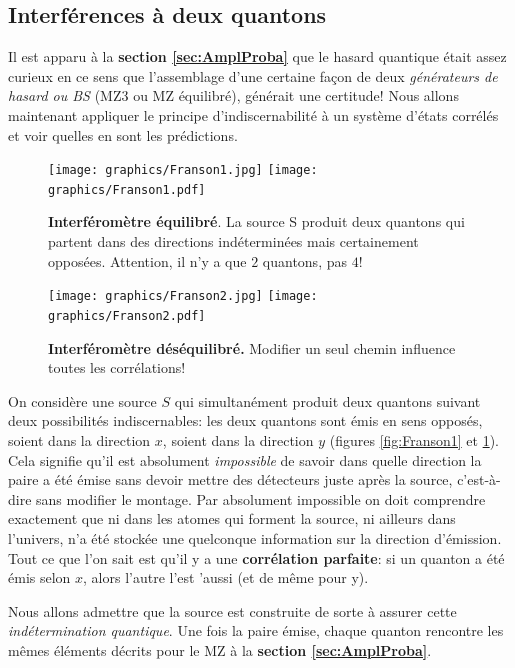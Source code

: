 \subsection{Interférences à deux quantons}

Il est apparu à la \textbf{section \ref{sec:AmplProba}} que le hasard quantique
était assez curieux en ce sens que l'assemblage d'une certaine façon de deux
\emph{générateurs de hasard ou BS} (MZ3 ou MZ équilibré), générait une
certitude! Nous allons maintenant appliquer le principe d'indiscernabilité à un
système d'états corrélés et voir quelles en sont les prédictions.

\begin{figure}[ptbh]
\centering
\begin{minipage}[c]{.48\linewidth}
\centering
\ifcase\msipdfoutput
	\texttt{[image: graphics/Franson1.jpg]}%
\else
	\texttt{[image: graphics/Franson1.pdf]}%
\fi
\caption{\textbf{Interféromètre équilibré}. La source S produit deux quantons
qui partent dans des directions indéterminées mais certainement opposées.
Attention, il n'y a que $2$ quantons, pas $4$!}%
\label{fig:Franson1}%
\end{minipage} \hfill\begin{minipage}[c]{.48\linewidth}
\centering
\ifcase\msipdfoutput
  \texttt{[image: graphics/Franson2.jpg]}%
\else
  \texttt{[image: graphics/Franson2.pdf]}%
\fi
\caption{\textbf{Interféromètre déséquilibré.} Modifier un seul chemin influence
toutes les corrélations!}%
\label{fig:Franson2}%
\end{minipage}
\end{figure}

On considère une source $S$ qui simultanément produit deux quantons suivant deux
possibilités indiscernables: les deux quantons sont émis en sens opposés, soient
dans la direction $x$, soient dans la direction $y$ (figures \ref{fig:Franson1}
et \ref{fig:Franson2}). Cela signifie qu'il est absolument \emph{impossible} de
savoir dans quelle direction la paire a été émise sans devoir mettre des
détecteurs juste après la source, c'est-à-dire sans modifier le montage. Par
absolument impossible on doit comprendre exactement que ni dans les atomes qui
forment la source, ni ailleurs dans l'univers, n'a été stockée une quelconque
information sur la direction d'émission. Tout ce que l'on sait est qu'il y a une
\textbf{corrélation parfaite}: si un quanton a été émis selon $x$, alors l'autre
l'est 'aussi (et de même pour y).

Nous allons admettre que la source est construite de sorte à assurer cette
\emph{indétermination quantique}. Une fois la paire émise, chaque quanton
rencontre les mêmes éléments décrits pour le MZ à la \textbf{section
\ref{sec:AmplProba}}.

